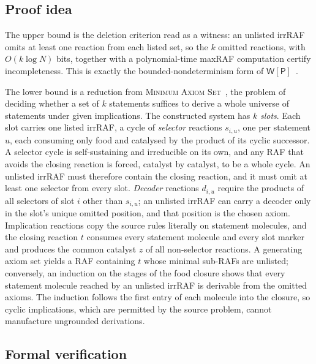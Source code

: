 \documentclass[11pt,a4paper]{article}
\theoremstyle{plain}
\theoremstyle{definition}
\theoremstyle{remark}
\newcommand{\MAS}{\textup{\textsc{Minimum Axiom Set}}}
\newcommand{\WP}{\mathsf{W[P]}}
\newcommand{\Nlen}{N}
\begin{document}
\subsection*{Proof idea}

The upper bound is the deletion criterion read as a witness: an unlisted irrRAF omits at least one reaction from each listed set, so the $k$ omitted reactions, with $O(k\log\Nlen)$ bits, together with a polynomial-time maxRAF computation certify incompleteness. This is exactly the bounded-nondeterminism form of $\WP$~\cite{cai1995structure,flum2006parameterized}.

The lower bound is a reduction from \MAS~\cite{abrahamson1995completeness}, the problem of deciding whether a set of $k$ statements suffices to derive a whole universe of statements under given implications. The constructed system has $k$ \emph{slots}. Each slot carries one listed irrRAF, a cycle of \emph{selector} reactions $s_{i,u}$, one per statement $u$, each consuming only food and catalysed by the product of its cyclic successor. A selector cycle is self-sustaining and irreducible on its own, and any RAF that avoids the closing reaction is forced, catalyst by catalyst, to be a whole cycle. An unlisted irrRAF must therefore contain the closing reaction, and it must omit at least one selector from every slot. \emph{Decoder} reactions $d_{i,u}$ require the products of all selectors of slot $i$ other than $s_{i,u}$; an unlisted irrRAF can carry a decoder only in the slot's unique omitted position, and that position is the chosen axiom. Implication reactions copy the source rules literally on statement molecules, and the closing reaction $t$ consumes every statement molecule and every slot marker and produces the common catalyst $z$ of all non-selector reactions. A generating axiom set yields a RAF containing $t$ whose minimal sub-RAFs are unlisted; conversely, an induction on the stages of the food closure shows that every statement molecule reached by an unlisted irrRAF is derivable from the omitted axioms. The induction follows the first entry of each molecule into the closure, so cyclic implications, which are permitted by the source problem, cannot manufacture ungrounded derivations.

\subsection*{Formal verification}
\end{document}
